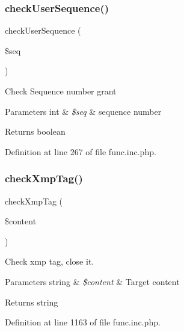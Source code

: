 \subsubsection{\texorpdfstring{check\+User\+Sequence()}{checkUserSequence()}}
{\footnotesize\ttfamily check\+User\+Sequence (\begin{DoxyParamCaption}\item[{}]{\$seq }\end{DoxyParamCaption})}

Check Sequence number grant


\begin{DoxyParams}[1]{Parameters}
int & {\em \$seq} & sequence number \\
\hline
\end{DoxyParams}
\begin{DoxyReturn}{Returns}
boolean 
\end{DoxyReturn}


Definition at line 267 of file func.\+inc.\+php.

\hypertarget{func_8inc_8php_a2095695afd9791bcab30bc8b53a68046}{}\label{func_8inc_8php_a2095695afd9791bcab30bc8b53a68046} 
\subsubsection{\texorpdfstring{check\+Xmp\+Tag()}{checkXmpTag()}}
{\footnotesize\ttfamily check\+Xmp\+Tag (\begin{DoxyParamCaption}\item[{}]{\$content }\end{DoxyParamCaption})}

Check xmp tag, close it.


\begin{DoxyParams}[1]{Parameters}
string & {\em \$content} & Target content \\
\hline
\end{DoxyParams}
\begin{DoxyReturn}{Returns}
string 
\end{DoxyReturn}


Definition at line 1163 of file func.\+inc.\+php.

\hypertarget{func_8inc_8php_a11562ea030a5d83564d0fbfcfabc8af9}{}\label{func_8inc_8php_a11562ea030a5d83564d0fbfcfabc8af9} 
